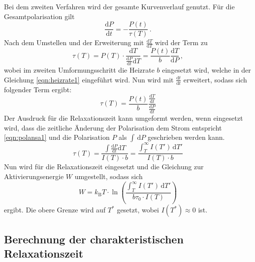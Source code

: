         \noindent Bei dem zweiten Verfahren wird der gesamte Kurvenverlauf genutzt. Für die Gesamtpolarisation gilt 
        \begin{equation*}
            \frac{\text{d}P}{\text{d}t} = -\frac{P(t)}{\tau(T)}\, .
        \end{equation*}
        Nach dem Umstellen und der Erweiterung mit $\frac{\text{d}T}{\text{d}T}$ wird der Term zu 
        \begin{equation*}
            \tau(T) = P(T) \cdot \frac{\text{d}T}{\frac{\text{d}P}{\text{d}t}\text{d}T } =  \frac{P(t)}{b} \frac{\text{d}T}{\text{d}P}\, ,
        \end{equation*}
        wobei im zweiten Umformungsschritt die Heizrate $b$ eingesetzt wird, welche in der Gleichung \eqref{eqn:heizrate1} eingeführt wird. 
        Nun wird mit $\frac{\text{d}t}{\text{d}t}$ erweitert, sodass sich folgender Term ergibt:
        \begin{equation*}
            \tau(T) = \frac{P(t)}{b} \frac{\frac{\text{d}T}{\text{d}t}}{\frac{\text{d}P}{\text{d}t}}
        \end{equation*}
        Der Ausdruck für die Relaxationszeit kann umgeformt werden, wenn eingesetzt wird, dass die zeitliche Änderung der Polarisation dem Strom entspricht \eqref{eqn:polansa1} 
        und die Polarisation $P$ als $\int \, \text{d}P$ geschrieben werden kann. 
        \begin{equation*}
            \tau(T) = \frac{\int \frac{\text{d}P}{\text{d}t} \text{d}T}{I(T) \cdot b} = \frac{\int_T^\infty I(T') \, \text{d}T'}{I(T) \cdot b}
        \end{equation*}
        Nun wird für die Relaxationszeit eingesetzt und die Gleichung zur Aktivierungsenergie $W$ umgestellt, sodass sich
        \begin{equation}
            W = k_\text{B} T \cdot \ln\left( \frac{\int_T^\infty I(T') \, \text{d}T'}{b \tau_0 \cdot I(T)}\right)
            \label{eqn:fur_Integral}
        \end{equation}
        ergibt. Die obere Grenze wird auf $T^*$ gesetzt, wobei $I(T^*) \approx 0$ ist. 


    \subsection{Berechnung der charakteristischen Relaxationszeit}

